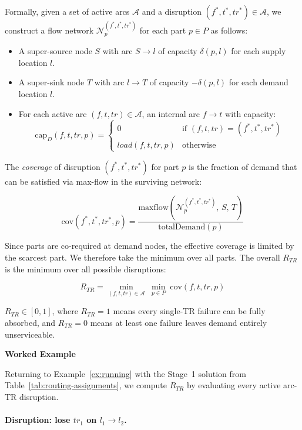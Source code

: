 \documentclass{article}
\begin{document}
Formally, given a set of active arcs $\mathcal{A}$ and a disruption
$(f^*, t^*, tr^*) \in \mathcal{A}$, we construct a flow network
$\mathcal{N}_p^{(f^*,t^*,tr^*)}$ for each part $p \in P$ as
follows:

\begin{itemize}
    \item A super-source node $S$ with arc $S \to l$ of capacity $\delta(p,l)$ for each supply location $l$.
    \item A super-sink node $T$ with arc $l \to T$ of capacity $-\delta(p,l)$ for each demand location $l$.
    \item For each active arc $(f,t,tr) \in \mathcal{A}$, an internal arc $f \to t$ with capacity:
    \[
        \mathrm{cap}_D(f,t,tr,p) =
        \begin{cases}
            0 & \text{if } (f,t,tr) = (f^*,t^*,tr^*) \\
            load(f,t,tr,p) & \text{otherwise}
        \end{cases}
    \]
\end{itemize}

The \emph{coverage} of disruption $(f^*,t^*,tr^*)$ for part $p$
is the fraction of demand that can be satisfied via max-flow in the
surviving network:

\[
    \mathrm{cov}(f^*,t^*,tr^*,p) =
    \frac{\mathrm{maxflow}\!\left(
        \mathcal{N}_p^{(f^*,t^*,tr^*)},\, S,\, T
    \right)}{\mathrm{totalDemand}(p)}
\]

Since parts are co-required at demand nodes, the effective coverage
is limited by the scarcest part. We therefore take the minimum over
all parts. The overall $R_{TR}$ is the minimum over all possible
disruptions:

\begin{equation}\label{eq:rtr}
    R_{TR} = \min_{(f,t,tr) \in \mathcal{A}}\;
             \min_{p \in P}\;
             \mathrm{cov}(f,t,tr,p)
\end{equation}

$R_{TR} \in [0,1]$, where $R_{TR} = 1$ means every single-TR
failure can be fully absorbed, and $R_{TR} = 0$ means at least one
failure leaves demand entirely unserviceable.

\textbf{Worked Example}

Returning to Example~\ref{ex:running} with the Stage~1 solution
from Table~\ref{tab:routing-assignments}, we compute $R_{TR}$ by
evaluating every active arc-TR disruption.

\paragraph{Disruption: lose $tr_1$ on $l_1 \to l_2$.}
\end{document}
